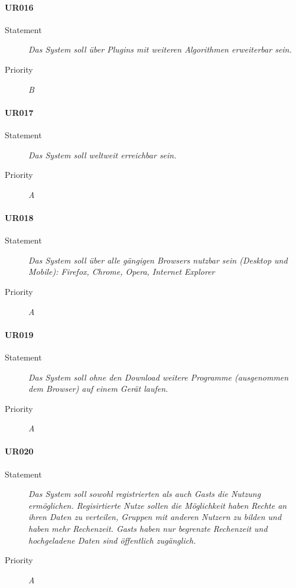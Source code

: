 \paragraph{UR016}
\begin{description}
\item[Statement] \textit{Das System soll über \gls{Plugins} mit weiteren Algorithmen erweiterbar sein.}
\item[Priority] \textit{B}
\end{description}

\paragraph{UR017}
\begin{description}
\item[Statement] \textit{Das System soll weltweit erreichbar sein.}
\item[Priority] \textit{A}
\end{description}

\paragraph{UR018}
\begin{description}
  \item[Statement]
    \textit{Das System soll über alle gängigen \glspl{Browser} nutzbar sein (Desktop und Mobile): Firefox, Chrome, Opera, Internet Explorer} %
  \item[Priority]
    \textit{A}
\end{description}

\paragraph{UR019}
\begin{description}
\item[Statement] \textit{Das System soll ohne den Download weitere Programme (ausgenommen dem Browser) auf einem Gerät laufen.}
\item[Priority] \textit{A}
\end{description}

\paragraph{UR020}
\begin{description}
\item[Statement] \textit{Das System soll sowohl registrierten als auch \glspl{Gast} die Nutzung ermöglichen. Regisirtierte Nutze sollen die Möglichkeit haben Rechte an ihren Daten zu verteilen, Gruppen mit anderen Nutzern zu bilden und haben mehr Rechenzeit. \glspl{Gast} haben nur begrenzte Rechenzeit und hochgeladene Daten sind öffentlich zugänglich.}
\item[Priority] \textit{A}
\end{description}

